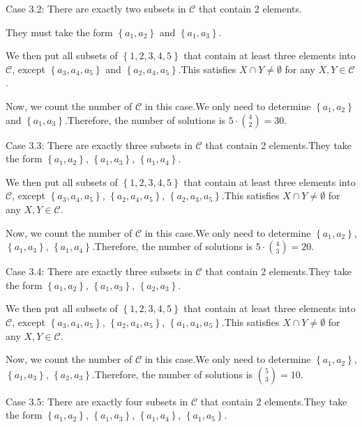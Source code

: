 \begin{enumerate}
 Case 3.2: There are exactly two subsets in $\mathcal C$ that contain 2 elements.

 They must take the form $\left\{ a_1, a_2 \right\}$ and $\left\{ a_1, a_3 \right\}$.

 We then put all subsets of $\left\{ 1, 2, 3, 4, 5 \right\}$ that contain at least three elements into $\mathcal C$, except $\left\{ a_3, a_4, a_5 \right\}$ and $\left\{ a_2, a_4, a_5 \right\}$.This satisfies $X \cap Y \neq \emptyset$ for any $X, Y \in \mathcal C$.

 Now, we count the number of $\mathcal C$ in this case.We only need to determine $\left\{ a_1, a_2 \right\}$ and $\left\{ a_1, a_3 \right\}$.Therefore, the number of solutions is $5 \cdot \binom{4}{2} = 30$.

 Case 3.3: There are exactly three subsets in $\mathcal C$ that contain 2 elements.They take the form $\left\{ a_1, a_2 \right\}$, $\left\{ a_1, a_3 \right\}$, $\left\{ a_1, a_4 \right\}$.

 We then put all subsets of $\left\{ 1, 2, 3, 4, 5 \right\}$ that contain at least three elements into $\mathcal C$, except $\left\{ a_3, a_4, a_5 \right\}$, $\left\{ a_2, a_4, a_5 \right\}$, $\left\{ a_2, a_3, a_5 \right\}$.This satisfies $X \cap Y \neq \emptyset$ for any $X, Y \in \mathcal C$.

 Now, we count the number of $\mathcal C$ in this case.We only need to determine $\left\{ a_1, a_2 \right\}$, $\left\{ a_1, a_3 \right\}$, $\left\{ a_1, a_4 \right\}$.Therefore, the number of solutions is $5 \cdot \binom{4}{3} = 20$.

 Case 3.4: There are exactly three subsets in $\mathcal C$ that contain 2 elements.They take the form $\left\{ a_1, a_2 \right\}$, $\left\{ a_1, a_3 \right\}$, $\left\{ a_2, a_3 \right\}$.

 We then put all subsets of $\left\{ 1, 2, 3, 4, 5 \right\}$ that contain at least three elements into $\mathcal C$, except $\left\{ a_3, a_4, a_5 \right\}$, $\left\{ a_2, a_4, a_5 \right\}$, $\left\{ a_1, a_4, a_5 \right\}$.This satisfies $X \cap Y \neq \emptyset$ for any $X, Y \in \mathcal C$.

 Now, we count the number of $\mathcal C$ in this case.We only need to determine $\left\{ a_1, a_2 \right\}$, $\left\{ a_1, a_3 \right\}$, $\left\{ a_2, a_3 \right\}$.Therefore, the number of solutions is $\binom{5}{3} = 10$.

 Case 3.5: There are exactly four subsets in $\mathcal C$ that contain 2 elements.They take the form $\left\{ a_1, a_2 \right\}$, $\left\{ a_1, a_3 \right\}$, $\left\{ a_1, a_4 \right\}$, $\left\{ a_1, a_5 \right\}$.


\end{enumerate}
